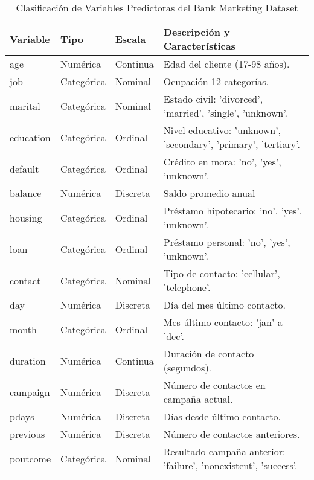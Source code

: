 \documentclass[10pt]{article}
\begin{document}
\begin{table}[h!]
\centering
\caption{Clasificación de Variables Predictoras del Bank Marketing Dataset}
\label{tab:clasificacion_predictores}
\begin{tabular}{p{1.7cm} p{1.8cm} p{1.2cm} p{9.4cm}}
\toprule
\textbf{Variable} & \textbf{Tipo} & \textbf{Escala} & \textbf{Descripción y Características} \\
\midrule
age & Numérica & Continua & Edad del cliente (17-98 años). \\
job & Categórica & Nominal & Ocupación 12 categorías. \\
marital & Categórica & Nominal & Estado civil: 'divorced', 'married', 'single', 'unknown'. \\
education & Categórica & Ordinal & Nivel educativo: 'unknown', 'secondary', 'primary', 'tertiary'. \\
default & Categórica & Ordinal & Crédito en mora: 'no', 'yes', 'unknown'. \\
balance & Numérica & Discreta & Saldo promedio anual\\
housing & Categórica & Ordinal & Préstamo hipotecario: 'no', 'yes', 'unknown'.\\
loan & Categórica & Ordinal & Préstamo personal: 'no', 'yes', 'unknown'. \\
contact & Categórica & Nominal & Tipo de contacto: 'cellular', 'telephone'. \\
day & Numérica & Discreta & Día del mes último contacto. \\
month & Categórica & Ordinal & Mes último contacto: 'jan' a 'dec'. \\
duration & Numérica & Continua & Duración de contacto (segundos). \\
campaign & Numérica & Discreta & Número de contactos en campaña actual. \\
pdays & Numérica & Discreta & Días desde último contacto. \\
previous & Numérica & Discreta & Número de contactos anteriores. \\
poutcome & Categórica & Nominal & Resultado campaña anterior: 'failure', 'nonexistent', 'success'. \\
\bottomrule
\end{tabular}
\end{table}
\end{document}
